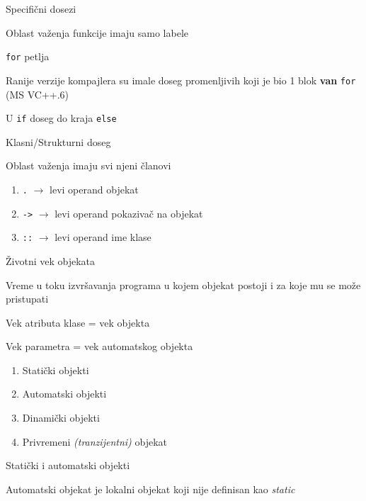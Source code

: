 \documentclass{article}
\newenvironment{xitemize}{%
    
    \itemize
    \larger
}{%
    \enditemize
}
\let\olditemize\itemize
\let\endolditemize\enditemize
\renewenvironment{itemize}{%
    \smaller
    \olditemize
}{%
    \endolditemize
}
\providecommand{\inlinecode}[1]{\texttt{#1}}
\begin{document}
\begin{xitemize}
    \item Specifični dosezi
    \begin{itemize}
        \item Oblast važenja funkcije imaju samo labele
        \item  \inlinecode{for} petlja
        \item Ranije verzije kompajlera su imale doseg promenljivih koji je bio 1 blok \textbf{van}  \inlinecode{for} (MS VC++.6)
        \item U  \inlinecode{if} doseg do kraja  \inlinecode{else}
    \end{itemize}
    \item Klasni/Strukturni doseg
    \begin{itemize}
        \item Oblast važenja imaju svi njeni članovi
        \begin{enumerate}
            \item  \inlinecode{.} $\rightarrow$ levi operand objekat
            \item   \inlinecode{->} $\rightarrow$ levi operand pokazivač na objekat
            \item  \inlinecode{::} $\rightarrow $ levi operand ime klase
        \end{enumerate}
    \end{itemize}
    \item Životni vek objekata
    \begin{itemize}
        \item Vreme u toku izvršavanja programa u kojem objekat postoji i za koje mu se može pristupati
        \item Vek atributa klase = vek objekta
        \item Vek parametra = vek automatskog objekta
        \begin{enumerate}
            \item Statički objekti
            \item Automatski objekti
            \item Dinamički objekti
            \item Privremeni \textit{(tranzijentni)} objekat
        \end{enumerate}
    \end{itemize}
    \item Statički i automatski objekti
    \begin{itemize}
        \item Automatski objekat je lokalni objekat koji nije definisan kao \textit{static}

\end{itemize}
\end{xitemize}
\end{document}
